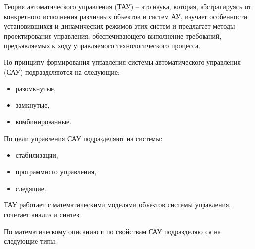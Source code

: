 \bigskip


\bigskip


		Теория автоматического управления (ТАУ) – это наука, которая, абстрагируясь от конкретного исполнения различных объектов
		и систем АУ, изучает особенности установившихся и динамических режимов этих систем и предлагает методы проектирования
		управления, обеспечивающего выполнение требований, предъявляемых к ходу управляемого технологического процесса.



		По принципу формирования управления системы автоматического управления (САУ) подразделяются на следующие:


\begin{itemize}
	\item 
			разомкнутые, 
	
	\item 
			замкнутые,
	
	\item 
			комбинированные.
	
\end{itemize}

		По цели управления САУ подразделяют на системы:



\begin{itemize}
	\item 
			стабилизации,
	
	\item 
			программного управления,
	
	\item 
			следящие.
	
\end{itemize}

		ТАУ работает с математическими моделями объектов системы управления, сочетает анализ и синтез.



		По математическому описанию и по свойствам САУ подразделяются на следующие типы:


